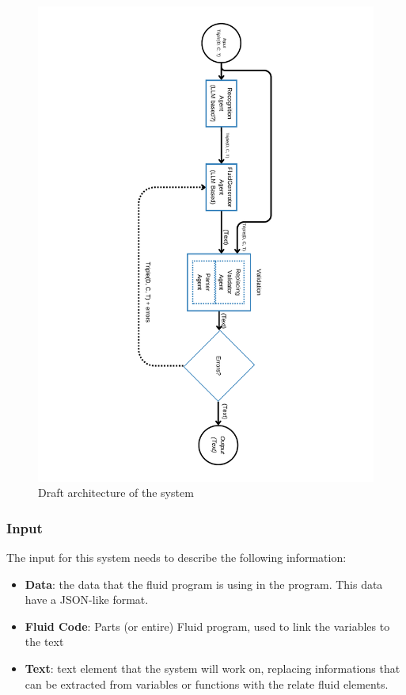 \begin{figure}
    \centering
    \includegraphics[width=1.2\linewidth]{fig/fluid-llm-architecture.pdf}
    \caption{Draft architecture of the system}
    \label{fig:fluid-llm-architecture}
\end{figure}

\subsubsection{Input}
The input for this system needs to describe the following information:
\begin{itemize}
    \item \textbf{Data}: the data that the fluid program is using in the program. This data have a JSON-like format.
    \item \textbf{Fluid Code}: Parts (or entire) Fluid program, used to link the variables to the text
    \item \textbf{Text}: text element that the system will work on, replacing informations that can be extracted from variables or functions with the relate fluid elements.
\end{itemize}

